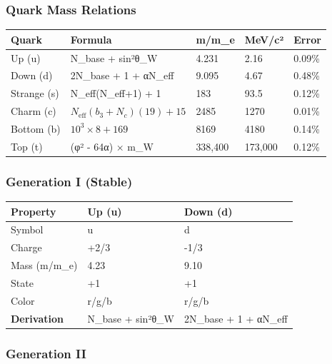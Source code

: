 \documentclass[
  11pt,
  letterpaper,
  twoside,
  openright]{book}
\begin{document}
\subsubsection{Quark Mass Relations}\label{quark-mass-relations}

\begin{longtable}[]{@{}lllll@{}}
\toprule\noalign{}
Quark & Formula & m/m\_e & MeV/c² & Error \\
\midrule\noalign{}
\endhead
\bottomrule\noalign{}
\endlastfoot
Up (u) & N\_base + sin²θ\_W & 4.231 & 2.16 & 0.09\% \\
Down (d) & 2N\_base + 1 + αN\_eff & 9.095 & 4.67 & 0.48\% \\
Strange (s) & N\_eff(N\_eff+1) + 1 & 183 & 93.5 & 0.12\% \\
Charm (c) & \(N_{\text{eff}}(b_3+N_c)(19) + 15\) & 2485 & 1270 &
0.01\% \\
Bottom (b) & \(10^3 \times 8 + 169\) & 8169 & 4180 & 0.14\% \\
Top (t) & (φ² - 64α) × m\_W & 338,400 & 173,000 & 0.12\% \\
\end{longtable}

\subsubsection{Generation I (Stable)}\label{generation-i-stable}

\begin{longtable}[]{@{}lll@{}}
\toprule\noalign{}
Property & Up (u) & Down (d) \\
\midrule\noalign{}
\endhead
\bottomrule\noalign{}
\endlastfoot
Symbol & u & d \\
Charge & +2/3 & -1/3 \\
Mass (m/m\_e) & 4.23 & 9.10 \\
State & +1 & +1 \\
Color & r/g/b & r/g/b \\
\textbf{Derivation} & N\_base + sin²θ\_W & 2N\_base + 1 + αN\_eff \\
\end{longtable}

\subsubsection{Generation II}\label{generation-ii}
\end{document}
